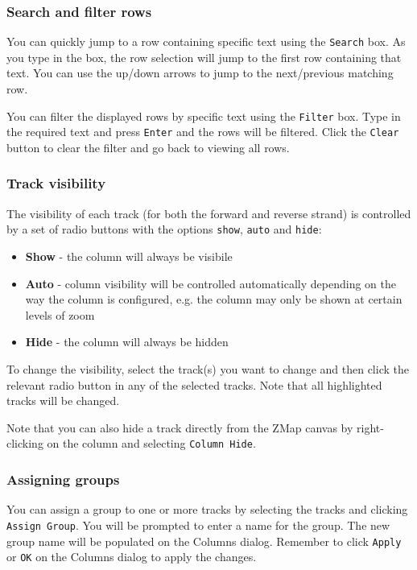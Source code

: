 \documentclass[letterpaper]{article}
\begin{document}
\subsubsection{Search and filter rows}
You can quickly jump to a row containing specific text using the \lstinline{Search} box. As you type in the box, the row selection will jump to the first row containing that text. You can use the up/down arrows to jump to the next/previous matching row.

You can filter the displayed rows by specific text using the \lstinline{Filter} box. Type in the required text and press \lstinline{Enter} and the rows will be filtered. Click the \lstinline{Clear} button to clear the filter and go back to viewing all rows.

\subsubsection{Track visibility}
The visibility of each track (for both the forward and reverse strand) is controlled by a set of radio buttons with the options \lstinline{show}, \lstinline{auto} and \lstinline{hide}:
\begin{itemize}
\item \textbf{Show} - the column will always be visibile 
\item \textbf{Auto} - column visibility will be controlled automatically depending on the way the column is configured, e.g. the column may only be shown at certain levels of zoom
\item \textbf{Hide} - the column will always be hidden
\end{itemize}

To change the visibility, select the track(s) you want to change and then click the relevant radio button in any of the selected tracks. Note that all highlighted tracks will be changed.

Note that you can also hide a track directly from the ZMap canvas by right-clicking on the column and selecting \lstinline{Column Hide}.

\subsubsection{Assigning groups} \label{sec_groups}
You can assign a group to one or more tracks by selecting the tracks and clicking \lstinline{Assign Group}. You will be prompted to enter a name for the group. The new group name will be populated on the Columns dialog. Remember to click \lstinline{Apply} or \lstinline{OK} on the Columns dialog to apply the changes.
\end{document}
